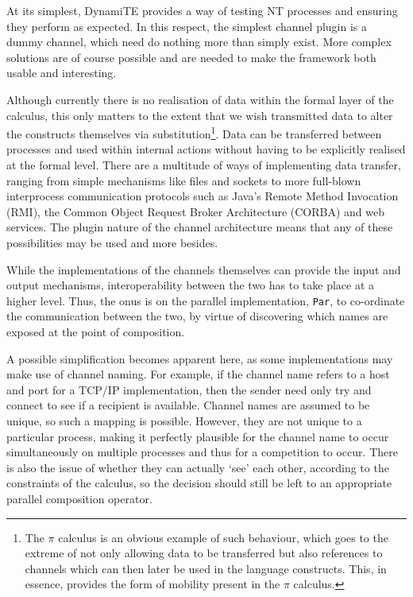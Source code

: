 At its simplest, DynamiTE provides a way of testing NT processes and
ensuring they perform as expected.  In this respect, the simplest
channel plugin is a dummy channel, which need do nothing more than
simply exist.  More complex solutions are of course possible and are
needed to make the framework both usable and interesting.  

Although currently there is no realisation of data within the formal
layer of the calculus, this only matters to the extent that we wish
transmitted data to alter the constructs themselves via
substitution\footnote{The $\pi$ calculus \cite{picalctutorial} is an
obvious example of such behaviour, which goes to the extreme of not only
allowing data to be transferred but also references to channels which
can then later be used in the language constructs.  This, in essence,
provides the form of mobility present in the $\pi$ calculus.}.  Data can
be transferred between processes and used within internal actions
without having to be explicitly realised at the formal level.  There are
a multitude of ways of implementing data transfer, ranging from simple
mechanisms like files and sockets to more full-blown interprocess
communication protocols such as Java's Remote Method Invocation (RMI),
the Common Object Request Broker Architecture (CORBA) and web services.
The plugin nature of the channel architecture means that any of these
possibilities may be used and more besides.

While the implementations of the channels themselves can provide the
input and output mechanisms, interoperability between the two has to
take place at a higher level.  Thus, the onus is on the parallel
implementation, \texttt{Par}, to co-ordinate the communication between
the two, by virtue of discovering which names are exposed at the point
of composition.

A possible simplification becomes apparent here, as some implementations
may make use of channel naming.  For example, if the channel name refers
to a host and port for a TCP/IP implementation, then the sender need
only try and connect to see if a recipient is available.  Channel names
are assumed to be unique, so such a mapping is possible.  However, they
are not unique to a particular process, making it perfectly plausible
for the channel name to occur simultaneously on multiple processes and
thus for a competition to occur.  There is also the issue of whether
they can actually `see' each other, according to the constraints of the
calculus, so the decision should still be left to an appropriate
parallel composition operator.

